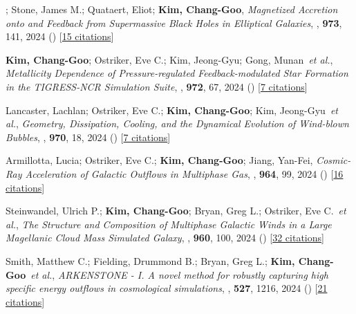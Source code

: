 \item[{11.}]; Stone, James M.; Quataert, Eliot; \textbf{Kim, Chang-Goo}, \textit{Magnetized Accretion onto and Feedback from Supermassive Black Holes in Elliptical Galaxies}, , \textbf{973}, 141, 2024 () [\href{http://adsabs.harvard.edu/abs/2024ApJ...973..141G}{15 citations}]

\item[{10.}]\textbf{Kim, Chang-Goo}; Ostriker, Eve C.; Kim, Jeong-Gyu; Gong, Munan~\textit{et al.}, \textit{Metallicity Dependence of Pressure-regulated Feedback-modulated Star Formation in the TIGRESS-NCR Simulation Suite}, , \textbf{972}, 67, 2024 () [\href{http://adsabs.harvard.edu/abs/2024ApJ...972...67K}{7 citations}]

\item[{9.}]Lancaster, Lachlan; Ostriker, Eve C.; \textbf{Kim, Chang-Goo}; Kim, Jeong-Gyu~\textit{et al.}, \textit{Geometry, Dissipation, Cooling, and the Dynamical Evolution of Wind-blown Bubbles}, , \textbf{970}, 18, 2024 () [\href{http://adsabs.harvard.edu/abs/2024ApJ...970...18L}{7 citations}]

\item[{8.}]Armillotta, Lucia; Ostriker, Eve C.; \textbf{Kim, Chang-Goo}; Jiang, Yan-Fei, \textit{Cosmic-Ray Acceleration of Galactic Outflows in Multiphase Gas}, , \textbf{964}, 99, 2024 () [\href{http://adsabs.harvard.edu/abs/2024ApJ...964...99A}{16 citations}]

\item[{7.}]Steinwandel, Ulrich P.; \textbf{Kim, Chang-Goo}; Bryan, Greg L.; Ostriker, Eve C.~\textit{et al.}, \textit{The Structure and Composition of Multiphase Galactic Winds in a Large Magellanic Cloud Mass Simulated Galaxy}, , \textbf{960}, 100, 2024 () [\href{http://adsabs.harvard.edu/abs/2024ApJ...960..100S}{32 citations}]

\item[{6.}]Smith, Matthew C.; Fielding, Drummond B.; Bryan, Greg L.; \textbf{Kim, Chang-Goo}~\textit{et al.}, \textit{ARKENSTONE - I. A novel method for robustly capturing high specific energy outflows in cosmological simulations}, , \textbf{527}, 1216, 2024 () [\href{http://adsabs.harvard.edu/abs/2024MNRAS.527.1216S}{21 citations}]

